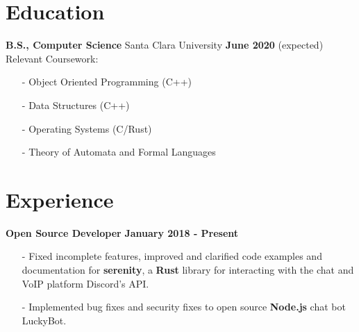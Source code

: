 \documentclass[margin,line]{res}
\begin{document}
\newcommand{\myname}{Derrick Lee}
\newlength{\mynamewidth}
\settowidth{\mynamewidth}{\namefont\myname}

\name{\hspace*{0.5\textwidth}\hspace{-0.5\mynamewidth} \myname \vspace*{.1in}}
\thispagestyle{empty}

\begin{resume}




\section{\sc Education}
{\bf B.S., Computer Science} Santa Clara University \hfill {\bf June 2020} (expected)\\
Relevant Coursework:
\begin{itemize} \itemsep -2pt
  \item[-] Object Oriented Programming (C++)
  \item[-] Data Structures (C++)
  \item[-] Operating Systems (C/Rust)
  \item[-] Theory of Automata and Formal Languages
\end{itemize}

\section{\sc Experience}
  {\bf Open Source Developer} \hfill {\bf January 2018 - Present} \\
  \vspace{-3.5mm}
  \begin{itemize} \itemsep -2pt
    \item[-] Fixed incomplete features, improved and clarified code examples and documentation for
    {\bf serenity}, a {\bf Rust} library for interacting with the chat and VoIP platform Discord's API. 
    \item[-] Implemented bug fixes and security fixes to open source {\bf Node.js} chat bot LuckyBot.
  \end{itemize}


\end{resume}
\end{document}
